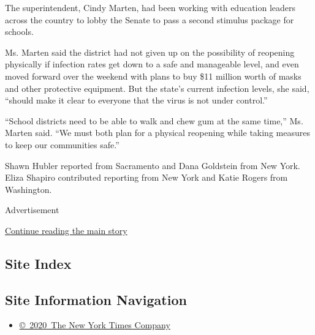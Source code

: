 The superintendent, Cindy Marten, had been working with education
leaders across the country to lobby the Senate to pass a second stimulus
package for schools.

Ms. Marten said the district had not given up on the possibility of
reopening physically if infection rates get down to a safe and
manageable level, and even moved forward over the weekend with plans to
buy \$11 million worth of masks and other protective equipment. But the
state's current infection levels, she said, ``should make it clear to
everyone that the virus is not under control.''

``School districts need to be able to walk and chew gum at the same
time,'' Ms. Marten said. ``We must both plan for a physical reopening
while taking measures to keep our communities safe.''

Shawn Hubler reported from Sacramento and Dana Goldstein from New York.
Eliza Shapiro contributed reporting from New York and Katie Rogers from
Washington.

Advertisement

\protect\hyperlink{after-bottom}{Continue reading the main story}

\hypertarget{site-index}{%
\subsection{Site Index}\label{site-index}}

\hypertarget{site-information-navigation}{%
\subsection{Site Information
Navigation}\label{site-information-navigation}}

\begin{itemize}
\tightlist
\item
  \href{https://help.nytimes.com/hc/en-us/articles/115014792127-Copyright-notice}{©~2020~The
  New York Times Company}
\end{itemize}


